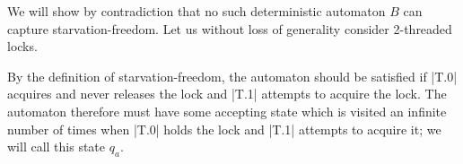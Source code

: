 



We will show by contradiction that no such deterministic automaton $B$ can capture starvation-freedom. Let us without loss of generality consider 2-threaded locks. 

By the definition of starvation-freedom, the automaton should be satisfied if |T.0| acquires and never releases the lock and |T.1| attempts to acquire the lock. The automaton therefore must have some accepting state which is visited an infinite number of times when |T.0| holds the lock and |T.1| attempts to acquire it; we will call this state $q_{a}$.




